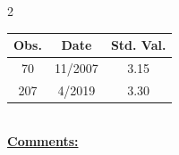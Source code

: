 
\bigskip 
\begin{multicols}{2}{ 
\begin{tabular}{ccc}
\hline  Obs.  &  Date &  Std. Val. \\ 
\hline 
                       70 &       11/2007 &          3.15 \vspace{-.12in} \\  
                      207 &        4/2019 &          3.30 \vspace{-.12in} \\  
 \end{tabular} 
\\ 
 \columnbreak 
 \singlespacing 
 \underline{\textbf{Comments:}} \\ 
 \bigskip       

 } 
\end{multicols} 
